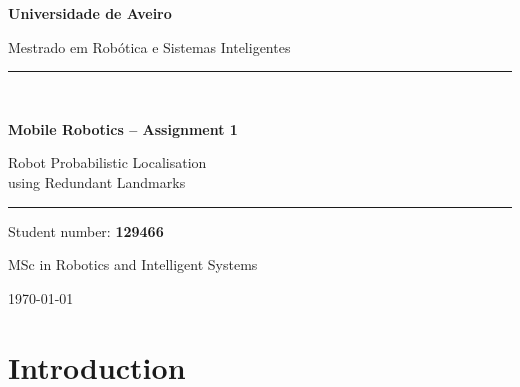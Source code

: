\documentclass[a4paper,11pt]{report}
\begin{document}
\begin{titlepage}
  \centering
  \vspace*{1.5cm}
  {\Large\bfseries Universidade de Aveiro\par}
  \vspace{0.3cm}
  {\large Mestrado em Rob\'otica e Sistemas Inteligentes\par}
  \vspace{2cm}
  \rule{\linewidth}{1pt}\\[0.6em]
  {\LARGE\bfseries Mobile Robotics -- Assignment 1\par}
  \vspace{0.4em}
  {\Large Robot Probabilistic Localisation\\using Redundant Landmarks\par}
  \rule{\linewidth}{1pt}
  \vspace{2cm}
  {\large Student number: \textbf{129466}\par}
  \vspace{0.3cm}
  {\large MSc in Robotics and Intelligent Systems\par}
  \vfill
  {\large \today\par}
\end{titlepage}

\begin{abstract}
\noindent
This report describes the implementation of a probabilistic localisation system for a mobile robot navigating through a set of fixed beacons. A smooth trajectory is planned from the origin $(0,0,0)$ through all $N$ beacon positions using Piecewise Cubic Hermite interpolation (\texttt{pchip}). An Extended Kalman Filter (EKF) fuses the unicycle motion model with range and bearing measurements from all visible beacons at each time step, gracefully ignoring any beacon that returns \texttt{NaN}. Running with $N{=}12$ beacons the filter achieves a mean position error of \SI{0.96}{\metre} and a mean heading error of \SI{0.009}{\radian} over a path of $\approx\SI{851}{\metre}$. Wheel velocities are also computed for three kinematic models -- Differential Drive, Tricycle and Omnidirectional -- and saved to the required output files.
\end{abstract}

\tableofcontents

\chapter{Introduction}
\end{document}

